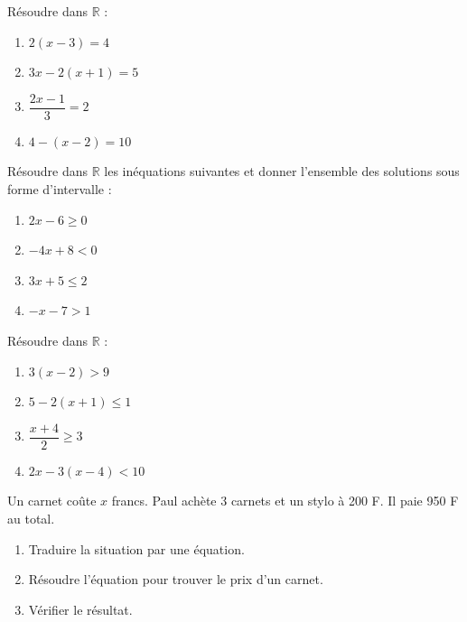 \documentclass[11pt]{article}
\begin{document}
\begin{exercice}
Résoudre dans $\mathbb{R}$ :
\begin{enumerate}
    \item $2(x - 3) = 4$
    \item $3x - 2(x + 1) = 5$
    \item $\dfrac{2x-1}{3} = 2$
    \item $4 - (x - 2) = 10$
\end{enumerate}
\end{exercice}

\begin{exercice}
Résoudre dans $\mathbb{R}$ les inéquations suivantes et donner l'ensemble des solutions sous forme d'intervalle :
\begin{enumerate}
    \item $2x - 6 \geqslant 0$
    \item $-4x + 8 < 0$
    \item $3x + 5 \leqslant 2$
    \item $-x - 7 > 1$
\end{enumerate}
\end{exercice}

\begin{exercice}
Résoudre dans $\mathbb{R}$ :
\begin{enumerate}
    \item $3(x - 2) > 9$
    \item $5 - 2(x + 1) \leqslant 1$
    \item $\dfrac{x+4}{2} \geqslant 3$
    \item $2x - 3(x - 4) < 10$
\end{enumerate}
\end{exercice}

\begin{exercice}
Un carnet coûte $x$ francs. Paul achète 3 carnets et un stylo à 200 F. Il paie 950 F au total.
\begin{enumerate}
    \item Traduire la situation par une équation.
    \item Résoudre l'équation pour trouver le prix d'un carnet.
    \item Vérifier le résultat.
\end{enumerate}
\end{exercice}
\end{document}
